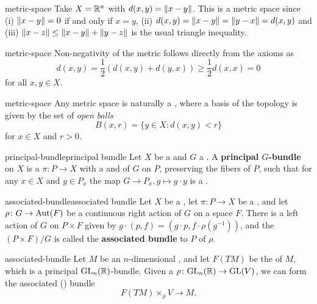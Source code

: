 \begin{example}{metric-space}
    Take $X = \mathbb{R}^n$ with $d(x, y) = \left\|x - y\right\|$. This is a metric space since (i) $\left\|x - y\right\| = 0$ if and only if $x = y$, (ii) $d(x, y) = \left\|x - y\right\| = \left\|y - x\right\| = d(x, y)$ and (iii) $\left\|x - z\right\| \le \left\|x - y\right\| + \left\|y - z\right\|$ is the usual triangle inequality.
\end{example}

\begin{example}{metric-space}
    Non-negativity of the metric follows directly from the axioms as
    \[ d(x, y) = \frac{1}{2} (d(x, y) + d(y, x)) \ge \frac{1}{2} d(x, x) = 0 \]
    for all $x, y \in X$.
\end{example}

\begin{example}{metric-space}
    Any metric space is naturally a , where a basis of the topology is given by the set of \textit{open balls}
    \[ B(x, r) = \{ y \in X : d(x, y) < r \} \]
    for $x \in X$ and $r > 0$.
\end{example}

\begin{topic}{principal-bundle}{principal bundle}
    Let $X$ be a  and $G$ a . A \textbf{principal $G$-bundle} on $X$ is a  $\pi \colon P \to X$ with a  and   of $G$ on $P$, preserving the fibers of $P$, such that for any $x \in X$ and $y \in P_x$ the map $G \to P_x, g \mapsto g \cdot y$ is a .
\end{topic}

\begin{topic}{associated-bundle}{associated bundle}
    Let $X$ be a , let $\pi \colon P \to X$ be a , and let $\rho \colon G \to \textup{Aut}(F)$ be a continuous right action of $G$ on a space $F$. There is a left action of $G$ on $P \times F$ given by $g \cdot (p, f) = (g \cdot p, f \cdot \rho(g^{-1}))$, and the  $(P \times F) / G$ is called the \textbf{associated bundle} to $P$ of $\rho$.
\end{topic}

\begin{example}{associated-bundle}
    Let $M$ be an $n$-dimensional , and let $F(TM)$ be the  of $M$, which is a principal $\textup{GL}_n(\mathbb{R})$-bundle. Given a  $\rho \colon \textup{GL}_n(\mathbb{R}) \to \textup{GL}(V)$, we can form the associated () bundle
    \[ F(TM) \times_\rho V \to M . \]
\end{example}

